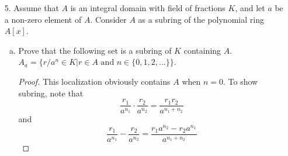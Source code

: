 \begin{itemize}
\begin{enumerate}[(a)]
    \item Prove that $\alpha(\Gamma_n(G)) \subseteq \Gamma_n(H)$ and that $\Gamma_n(\alpha) : \Gamma_n(G) \rar \Gamma_n(H)$ defined by $\Gamma_n(\alpha)(g) = \alpha(g)$ is a well-defined group homomorphism.
    \begin{proof}
    Let $x \in \Gamma_n(G)$, meaning $n^{m}x = 0$. Now $\alpha(x) = y$ for some $y \in H$. Thus $$n^{m}y = n^{m} \alpha(x) = \alpha(n^{m} x) = 0.$$
    Hence $\alpha(\Gamma_n(G)) \subseteq \Gamma_n(H)$.
    
    \medskip 
    
    Showing well-definedness and homomorphism is just writing it out.
    \end{proof}
    
    \item Prove that if $\alpha$ is injective (i.e., 1-1), then so is $\Gamma_n(\alpha)$.
    \begin{proof}
    Suppose that $\alpha$ is injective. Then $\Kern(\Gamma_n(\alpha)) = \Kern(\alpha(g)) = \{0\}$ implies that $g = 0$.
    \end{proof}
    
    \item Prove or disprove that if $\alpha$ is surjective (i.e., onto), then so is $\Gamma_n(\alpha)$.
    \begin{proof}
    It is not true. Let $G = \bbz$ and $H = \bbz_2$. Then taking $\alpha : G \rar H$ as the reduction modulo 2 is a surjective homomorphism. But $2^1 h = 0$ for all $h \in H$, hence $\Gamma_2(H) = H$. But $\bbz$ has no non-zero elements of finite order, so $1 \in H$ has no preimage in $\Gamma_2(G)$.
    \end{proof}
    
    \item Prove that if $G$ is finitely generated, then $\Gamma_n(G)$ is finite.
    \begin{proof}
    Apply the fundamental theorem of finitely generated Abelian groups.
    \end{proof}
\end{enumerate}









\item[5.] Assume that $A$ is an integral domain with field of fractions $K$, and let $a$ be a non-zero element of $A$. Consider $A$ as a subring of the polynomial ring $A[x]$.
\begin{enumerate}[(a)]
    \item Prove that the following set is a subring of $K$ containing $A$. $A_a = \{r/a^n \in K | r \in A \text{ and } n \in \{0, 1, 2, ...\}\}$.
    \begin{proof}
    This localization obviously contains $A$ when $n=0$. To show subring, note that 
    $$\frac{r_1}{a^{n_1}} \cdot \frac{r_2}{a^{n_2}} = \frac{r_1 r_2}{a^{n_1 + n_2}}$$
    and 
    $$\frac{r_1}{a^{n_1}} - \frac{r_2}{a^{n_2}} = \frac{r_1 a^{n_2} - r_2 a^{n_1}}{a^{n_1 + n_2}}$$
    \end{proof}
    

\end{enumerate}
\end{itemize}
